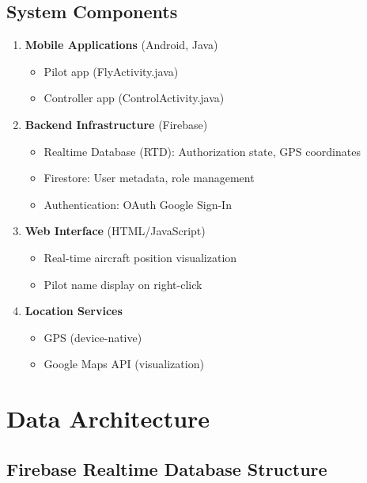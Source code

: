 \documentclass[11pt,a4paper]{report}
\begin{document}
\subsection{System Components}

\begin{enumerate}
    \item \textbf{Mobile Applications} (Android, Java)
    \begin{itemize}
        \item Pilot app (FlyActivity.java)
        \item Controller app (ControlActivity.java)
    \end{itemize}

    \item \textbf{Backend Infrastructure} (Firebase)
    \begin{itemize}
        \item Realtime Database (RTD): Authorization state, GPS coordinates
        \item Firestore: User metadata, role management
        \item Authentication: OAuth Google Sign-In
    \end{itemize}

    \item \textbf{Web Interface} (HTML/JavaScript)
    \begin{itemize}
        \item Real-time aircraft position visualization
        \item Pilot name display on right-click
    \end{itemize}

    \item \textbf{Location Services}
    \begin{itemize}
        \item GPS (device-native)
        \item Google Maps API (visualization)
    \end{itemize}
\end{enumerate}

\section{Data Architecture}

\subsection{Firebase Realtime Database Structure}
\end{document}
